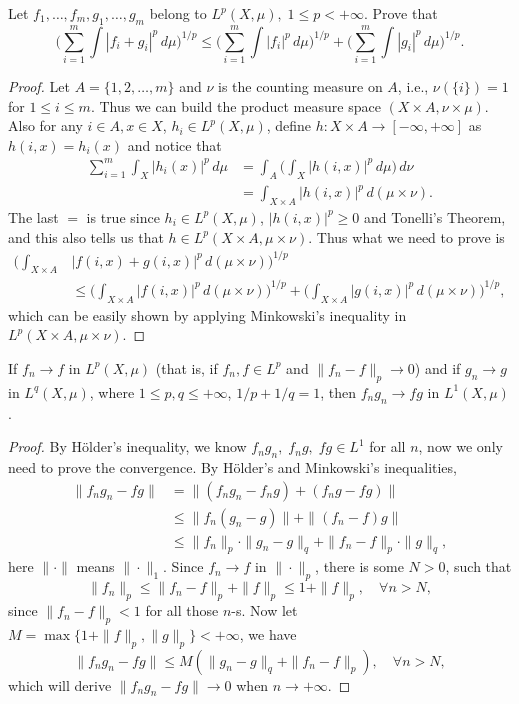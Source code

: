 \begin{pro}%
	Let $f_1,\dots,f_m,g_1,\dots,g_m$ belong to $L^p(X,\mu),\;1\leq p< +\infty$. Prove that
	\[\bigg(\sum_{i=1}^m \int|f_i+g_i|^p\,d\mu\bigg)^{1/p}\leq 
	\bigg(\sum_{i=1}^m \int |f_i|^p\,d\mu\bigg)^{1/p}+
	\bigg(\sum_{i=1}^m \int |g_i|^p\,d\mu\bigg)^{1/p}.\]
\end{pro}
\begin{proof}
	Let $A=\{1,2,\dots,m\}$ and $\nu$ is the counting measure on $A$, i.e., $\nu(\{i\})=1$ for $1\leq i\leq m$. 
	Thus we can build the product measure space $(X\times A,\nu\times \mu)$. Also for any $i\in A,x\in X$, $h_i\in L^p(X,\mu)$, define $h\colon X\times A\to [-\infty,+\infty]$ as $h(i,x)=h_i(x)$ and notice that
	\begin{align*}
	\sum_{i=1}^m \int_X |h_i(x)|^p\,d\mu
	&=\int_A\bigg(\int_X |h(i,x)|^p\,d\mu\bigg)\,d\nu\\
	&=\int_{X\times A} |h(i,x)|^p\,d(\mu\times\nu).
	\end{align*}
	The last $=$ is true since $h_i\in L^p(X,\mu)$, $|h(i,x)|^p\geq 0$ and Tonelli's Theorem, and this also tells us that $h\in L^p(X\times A,\mu\times \nu)$. Thus what we need to prove is
	\begin{align*}
	\bigg(\int_{X\times A}&|f(i,x)+g(i,x)|^p\,d(\mu\times \nu)\bigg)^{1/p}\\
	&\leq \bigg(\int_{X\times A}|f(i,x)|^p\,d(\mu\times \nu)\bigg)^{1/p}+
	\bigg(\int_{X\times A}|g(i,x)|^p\,d(\mu\times \nu)\bigg)^{1/p},
	\end{align*}
	which can be easily shown by applying Minkowski's inequality in $L^p(X\times A,\mu\times \nu)$.
\end{proof}

\begin{pro}%
	If $f_n\to f$ in $L^p(X,\mu)$ (that is, if $f_n,f\in L^p$ and $\|f_n-f\|_p\to 0$) and if $g_n\to g$ in $L^q(X,\mu)$, where $1\leq p,q\leq +\infty$, $1/p+1/q=1$, then $f_ng_n\to fg$ in $L^1(X,\mu)$.
\end{pro}
\begin{proof}
	By H\"older's inequality, we know $f_ng_n,\;f_ng,\;fg\in L^1$ for all $n$, now we only need to prove the convergence. By H\"older's and Minkowski's inequalities, 
	\begin{align*}
		\|f_ng_n-fg\|&= \|(f_ng_n-f_ng)+(f_ng-fg)\|\\
					 &\leq \|f_n(g_n-g)\|+\|(f_n-f)g\|\\
					 &\leq \|f_n\|_p\cdot\|g_n-g\|_q+\|f_n-f\|_p\cdot\|g\|_q,
	\end{align*}
	here $\|\cdot\|$ means $\|\cdot\|_1$. Since $f_n\to f$ in $\|\cdot\|_p$, there is some $N>0$, such that 
	\[\|f_n\|_p\leq \|f_n-f\|_p+\|f\|_p\leq 1+\|f\|_p,\quad \forall n>N,\]
	since $\|f_n-f\|_p<1$ for all those $n$-s. Now let $M=\max\{1+\|f\|_p,\|g\|_p\}<+\infty$, we have
	\[\|f_ng_n-fg\|\leq M(\|g_n-g\|_q+\|f_n-f\|_p),\quad \forall n>N,\]
	which will derive $\|f_ng_n-fg\|\to 0$ when $n\to+\infty$.
\end{proof}

